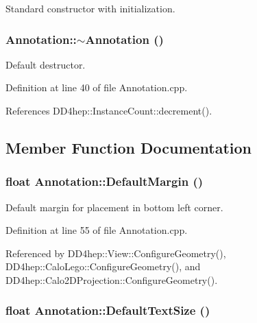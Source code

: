Standard constructor with initialization. \hypertarget{class_d_d4hep_1_1_annotation_a95144855eb445040d47951c668dc5764}{
\subsubsection[{$\sim$Annotation}]{\setlength{\rightskip}{0pt plus 5cm}Annotation::$\sim$Annotation ()}}
\label{class_d_d4hep_1_1_annotation_a95144855eb445040d47951c668dc5764}


Default destructor. 

Definition at line 40 of file Annotation.cpp.

References DD4hep::InstanceCount::decrement().

\subsection{Member Function Documentation}
\hypertarget{class_d_d4hep_1_1_annotation_a8d10a81577c74708c3458905b5d239dc}{
\subsubsection[{DefaultMargin}]{\setlength{\rightskip}{0pt plus 5cm}float Annotation::DefaultMargin ()}}
\label{class_d_d4hep_1_1_annotation_a8d10a81577c74708c3458905b5d239dc}


Default margin for placement in bottom left corner. 

Definition at line 55 of file Annotation.cpp.

Referenced by DD4hep::View::ConfigureGeometry(), DD4hep::CaloLego::ConfigureGeometry(), and DD4hep::Calo2DProjection::ConfigureGeometry().\hypertarget{class_d_d4hep_1_1_annotation_a935265c70c04d194c2de49408f860db6}{
\subsubsection[{DefaultTextSize}]{\setlength{\rightskip}{0pt plus 5cm}float Annotation::DefaultTextSize ()}}
\label{class_d_d4hep_1_1_annotation_a935265c70c04d194c2de49408f860db6}


